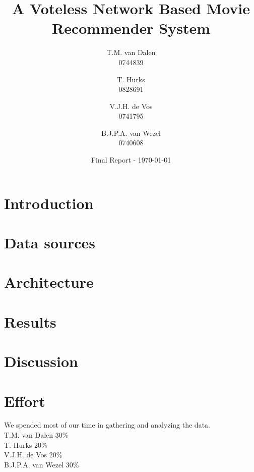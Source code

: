 \documentclass[a4paper,11pt,twocolumn]{article}
\title{
	A Voteless Network Based Movie Recommender System\\
}
\author{
	T.M. van Dalen\\
	0744839
	\and
	T. Hurks\\
	0828691
	\and
	V.J.H. de Vos\\
	0741795
	\and
	B.J.P.A. van Wezel\\
	0740608
}
\date{
	\Large{Final Report} - \today
}
\begin{document}
	\maketitle
	
	
	
	\section{Introduction}
	\label{sec:intro}
	
	
	\section{Data sources}
	\label{sec:data}
	
	
	\section{Architecture}
	\label{sec:arch}
	
	
	\section{Results}
	\label{sec:results}
	
	
	\section{Discussion}
	\label{sec:discussion}
	
	
	
	
	\section{Effort}
	We spended most of our time in gathering and analyzing the data.\\
	T.M. van Dalen 30\%\\
	T. Hurks 20\% \\
	V.J.H. de Vos 20\% \\
	B.J.P.A. van Wezel 30\%\\
	
	
\end{document}
